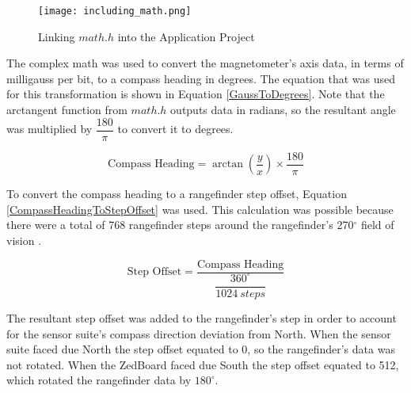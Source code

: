 \begin{figure}[H]
	\centerline{\texttt{[image: including\_math.png]}}
	\caption{Linking $math.h$ into the Application Project}
	\label{including_math}
\end{figure}

The complex math was used to convert the magnetometer's axis data, in terms of milligauss per bit, to a compass heading in degrees. The equation that was used for this transformation is shown in Equation \ref{GaussToDegrees}. Note that the arctangent function from $math.h$ outputs data in radians, so the resultant angle was multiplied by $\dfrac{180}{\pi}$ to convert it to degrees.

\begin{equation}
	\textrm{Compass Heading} = \arctan(\dfrac{y}{x})\times\dfrac{180}{\pi}
	\label{GaussToDegrees}
\end{equation}

To convert the compass heading to a rangefinder step offset, Equation \ref{CompassHeadingToStepOffset} was used. This calculation was possible because there were a total of 768 rangefinder steps around the rangefinder's 270$^\circ$ field of vision \cite{urg04lx_datasheet}.

\begin{equation}
	\textrm{Step Offset} = \dfrac{\textrm{Compass Heading}}{\dfrac{360^\circ}{1024\ steps}}
	\label{CompassHeadingToStepOffset}
\end{equation}

The resultant step offset was added to the rangefinder's step in order to account for the sensor suite's compass direction deviation from North. When the sensor suite faced due North the step offset equated to 0, so the rangefinder's data was not rotated. When the ZedBoard faced due South the step offset equated to 512, which rotated the rangefinder data by $180^\circ$.






